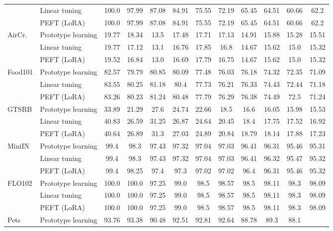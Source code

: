 \begin{tabular}{l l cccccccccc}
 & Linear tuning & 100.0 & 97.99 & 87.08 & 84.91 & 75.55 & 72.19 & 65.45 & 64.51 & 60.66 & 62.2 \\
 & PEFT (LoRA) & 100.0 & 97.99 & 87.08 & 84.91 & 75.55 & 72.19 & 65.45 & 64.51 & 60.66 & 62.2 \\
\midrule
\multirow{3}{*}{AirCr.} & Prototype learning & 19.77 & 18.34 & 13.5 & 17.48 & 17.71 & 17.13 & 14.91 & 15.88 & 15.28 & 15.51 \\
 & Linear tuning & 19.77 & 17.12 & 13.1 & 16.76 & 17.85 & 16.8 & 14.67 & 15.62 & 15.0 & 15.32 \\
 & PEFT (LoRA) & 19.52 & 16.84 & 13.0 & 16.69 & 17.79 & 16.75 & 14.67 & 15.62 & 15.0 & 15.32 \\
\midrule
\multirow{3}{*}{Food101} & Prototype learning & 82.57 & 79.79 & 80.85 & 80.09 & 77.48 & 76.03 & 76.18 & 74.32 & 72.35 & 71.09 \\
 & Linear tuning & 83.55 & 80.25 & 81.18 & 80.4 & 77.73 & 76.21 & 76.33 & 74.43 & 72.44 & 71.18 \\
 & PEFT (LoRA) & 83.26 & 80.23 & 81.24 & 80.48 & 77.79 & 76.29 & 76.38 & 74.49 & 72.5 & 71.24 \\
\midrule
\multirow{3}{*}{GTSRB} & Prototype learning & 33.89 & 21.29 & 27.6 & 24.74 & 22.66 & 18.5 & 16.6 & 16.05 & 15.98 & 15.53 \\
 & Linear tuning & 40.83 & 26.59 & 31.25 & 26.87 & 24.64 & 20.45 & 18.4 & 17.75 & 17.52 & 16.92 \\
 & PEFT (LoRA) & 40.64 & 26.89 & 31.3 & 27.03 & 24.89 & 20.84 & 18.79 & 18.14 & 17.88 & 17.23 \\
\midrule
\multirow{3}{*}{MiniIN} & Prototype learning & 99.4 & 98.3 & 97.43 & 97.32 & 97.04 & 97.03 & 96.41 & 96.31 & 95.46 & 95.31 \\
 & Linear tuning & 99.4 & 98.3 & 97.43 & 97.32 & 97.04 & 97.03 & 96.41 & 96.32 & 95.47 & 95.32 \\
 & PEFT (LoRA) & 99.4 & 98.25 & 97.4 & 97.3 & 97.02 & 97.02 & 96.4 & 96.31 & 95.46 & 95.32 \\
\midrule
\multirow{3}{*}{FLO102} & Prototype learning & 100.0 & 100.0 & 97.25 & 99.0 & 98.5 & 98.57 & 98.5 & 98.11 & 98.3 & 98.09 \\
 & Linear tuning & 100.0 & 100.0 & 97.25 & 99.0 & 98.5 & 98.57 & 98.5 & 98.11 & 98.3 & 98.09 \\
 & PEFT (LoRA) & 100.0 & 100.0 & 97.25 & 99.0 & 98.5 & 98.57 & 98.5 & 98.11 & 98.3 & 98.09 \\
\midrule
\multirow{3}{*}{Pets} & Prototype learning & 93.76 & 93.38 & 90.48 & 92.51 & 92.81 & 92.64 & 88.78 & 89.3 & 88.1 \\

\end{tabular}

